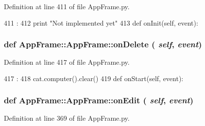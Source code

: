 Definition at line 411 of file AppFrame.py.


\begin{DoxyCode}
411                                 :
412         print "Not implemented yet"
413         
    def onInit(self, event):
\end{DoxyCode}
\hypertarget{classAppFrame_1_1AppFrame_ad5e9ba93cb8013656d6500774cf60b53}{
\subsubsection[{onDelete}]{\setlength{\rightskip}{0pt plus 5cm}def AppFrame::AppFrame::onDelete ( {\em self}, \/   {\em event})}}
\label{classAppFrame_1_1AppFrame_ad5e9ba93cb8013656d6500774cf60b53}


Definition at line 417 of file AppFrame.py.


\begin{DoxyCode}
417                              :
418         cat.computer().clear()        
419         
    def onStart(self, event):
\end{DoxyCode}
\hypertarget{classAppFrame_1_1AppFrame_a17e104bbc8544539fcad9d3f75583438}{
\subsubsection[{onEdit}]{\setlength{\rightskip}{0pt plus 5cm}def AppFrame::AppFrame::onEdit ( {\em self}, \/   {\em event})}}
\label{classAppFrame_1_1AppFrame_a17e104bbc8544539fcad9d3f75583438}


Definition at line 369 of file AppFrame.py.


